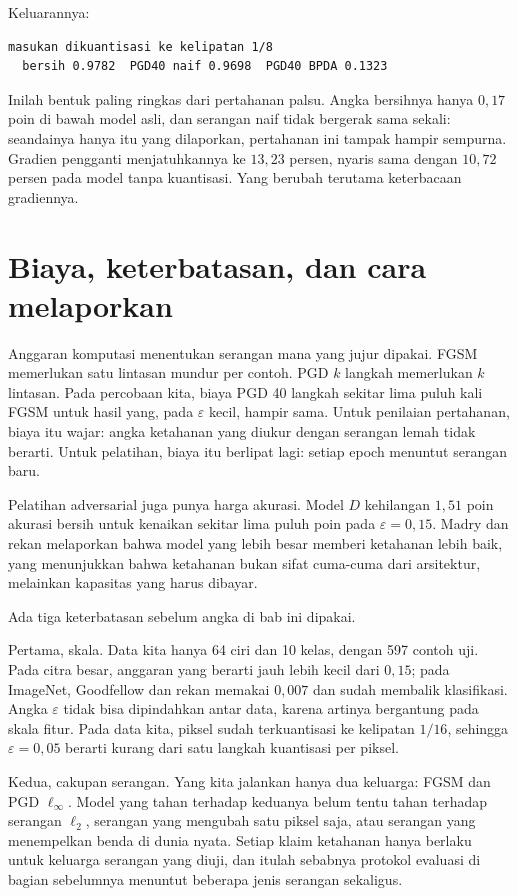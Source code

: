 Keluarannya:

\begin{verbatim}
masukan dikuantisasi ke kelipatan 1/8
  bersih 0.9782  PGD40 naif 0.9698  PGD40 BPDA 0.1323
\end{verbatim}

Inilah bentuk paling ringkas dari pertahanan palsu. Angka bersihnya hanya $0{,}17$
poin di bawah model asli, dan serangan naif tidak bergerak sama sekali: seandainya
hanya itu yang dilaporkan, pertahanan ini tampak hampir sempurna. Gradien pengganti
menjatuhkannya ke $13{,}23$ persen, nyaris sama dengan $10{,}72$ persen pada model
tanpa kuantisasi. Yang berubah terutama keterbacaan gradiennya.

\section{Biaya, keterbatasan, dan cara melaporkan}

Anggaran komputasi menentukan serangan mana yang jujur dipakai. FGSM memerlukan satu
lintasan mundur per contoh. PGD $k$ langkah memerlukan $k$ lintasan. Pada percobaan
kita, biaya PGD 40 langkah sekitar lima puluh kali FGSM untuk hasil yang, pada
$\varepsilon$ kecil, hampir sama. Untuk penilaian pertahanan, biaya itu wajar: angka
ketahanan yang diukur dengan serangan lemah tidak berarti. Untuk pelatihan, biaya itu
berlipat lagi: setiap epoch menuntut serangan baru.

Pelatihan adversarial juga punya harga akurasi. Model $D$ kehilangan $1{,}51$ poin
akurasi bersih untuk kenaikan sekitar lima puluh poin pada $\varepsilon=0{,}15$.
Madry dan rekan melaporkan bahwa model yang lebih besar memberi ketahanan lebih baik,
yang menunjukkan bahwa ketahanan bukan sifat cuma-cuma dari arsitektur, melainkan
kapasitas yang harus dibayar.

Ada tiga keterbatasan sebelum angka di bab ini dipakai.

Pertama, skala. Data kita hanya 64 ciri dan 10 kelas, dengan 597 contoh uji. Pada
citra besar, anggaran yang berarti jauh lebih kecil dari $0{,}15$; pada ImageNet,
Goodfellow dan rekan memakai $0{,}007$ dan sudah membalik klasifikasi. Angka
$\varepsilon$ tidak bisa dipindahkan antar data, karena artinya bergantung pada skala
fitur. Pada data kita, piksel sudah terkuantisasi ke kelipatan $1/16$, sehingga
$\varepsilon=0{,}05$ berarti kurang dari satu langkah kuantisasi per piksel.

Kedua, cakupan serangan. Yang kita jalankan hanya dua keluarga: FGSM dan PGD
$\ell_\infty$. Model yang tahan terhadap keduanya belum tentu tahan terhadap serangan
$\ell_2$, serangan yang mengubah satu piksel saja, atau serangan yang menempelkan
benda di dunia nyata. Setiap klaim ketahanan hanya berlaku untuk keluarga serangan
yang diuji, dan itulah sebabnya protokol evaluasi di bagian sebelumnya menuntut
beberapa jenis serangan sekaligus.

